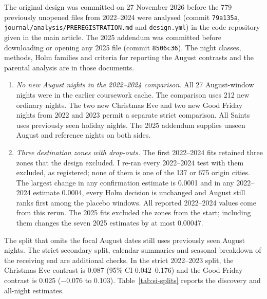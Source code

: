 \documentclass[pdflatex,sn-mathphys-num]{sn-jnl}
\begin{document}
The original design was committed on 27 November 2026 before the 779 previously unopened files from 2022--2024 were analysed (commit \texttt{79a135a}, \nolinkurl{journal/analysis/PREREGISTRATION.md} and \nolinkurl{design.yml}) in the code repository given in the main article. The 2025 addendum was committed before downloading or opening any 2025 file (commit \texttt{8506c36}). The night classes, methods, Holm families and criteria for reporting the August contrasts and the parental analysis are in those documents.
\begin{enumerate}
\item \emph{No new August nights in the 2022--2024 comparison.} All 27 August-window nights were in the earlier coursework cache. The comparison uses 212 new ordinary nights. The two new Christmas Eve and two new Good Friday nights from 2022 and 2023 permit a separate strict comparison. All Saints uses previously seen holiday nights. The 2025 addendum supplies unseen August and reference nights on both sides.
\item \emph{Three destination zones with drop-outs.} The first 2022--2024 fits retained three zones that the design excluded. I re-ran every 2022--2024 test with them excluded, as registered; none of them is one of the 137 or 675 origin cities. The largest change in any confirmation estimate is 0.0001 and in any 2022--2024 estimate 0.0004, every Holm decision is unchanged and August still ranks first among the placebo windows. All reported 2022--2024 values come from this rerun. The 2025 fits excluded the zones from the start; including them changes the seven 2025 estimates by at most 0.00047.
\end{enumerate}
The split that omits the focal August dates still uses previously seen August nights. The strict secondary split, calendar summaries and seasonal breakdown of the receiving end are additional checks. In the strict 2022--2023 split, the Christmas Eve contrast is 0.087 (95\% CI 0.042--0.176) and the Good Friday contrast is 0.025 ($-0.076$ to 0.103). Table~\ref{tab:si-splits} reports the discovery and all-night estimates.
\end{document}

